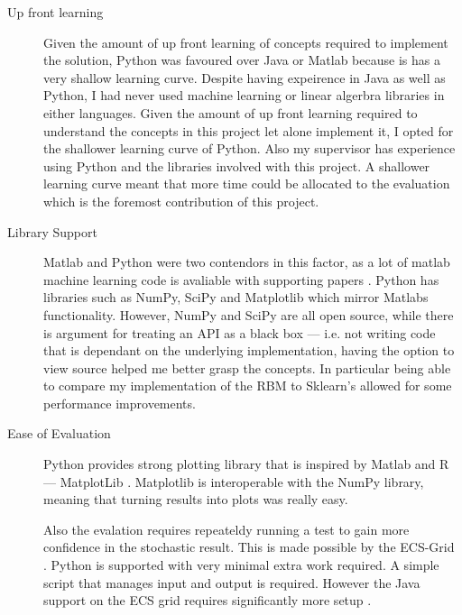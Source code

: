 \begin{description}
\item[Up front learning] Given the amount of up front learning of concepts required to implement the solution, Python was favoured over Java or Matlab because is has a very shallow learning curve. Despite having expeirence in Java as well as Python, I had never used machine learning or linear algerbra libraries in either languages. Given the amount of up front learning required to understand the concepts in this project let alone implement it, I opted for the shallower learning curve of Python. Also my supervisor has experience using Python and the libraries involved with this project. A shallower learning curve meant that more time could be allocated to the evaluation which is the foremost contribution of this project.
\item[Library Support] Matlab and Python were two contendors in this factor, as a lot of matlab machine learning code is avaliable with supporting papers \todocite{}. Python has libraries such as NumPy, SciPy and Matplotlib \todocite{} which mirror Matlabs functionality. However, NumPy and SciPy are all open source, while there is argument for treating an API as a black box --- i.e. not writing code that is dependant on the underlying implementation, having the option to view source helped me better grasp the concepts. In particular being able to compare my implementation of the RBM to Sklearn's \todocite{} allowed for some performance improvements.
\item[Ease of Evaluation] Python provides strong plotting library that is inspired by Matlab and R --- MatplotLib \todocite{}. Matplotlib is interoperable with the NumPy library, meaning that turning results into plots was really easy.

Also the evalation requires repeateldy running a test to gain more confidence in the stochastic result. This is made possible by the ECS-Grid \todocite{}. Python is supported with very minimal extra work required. A simple script that manages input and output is required. However the Java support on the ECS grid requires significantly more setup \todocite{}. 
\end{description}
%


